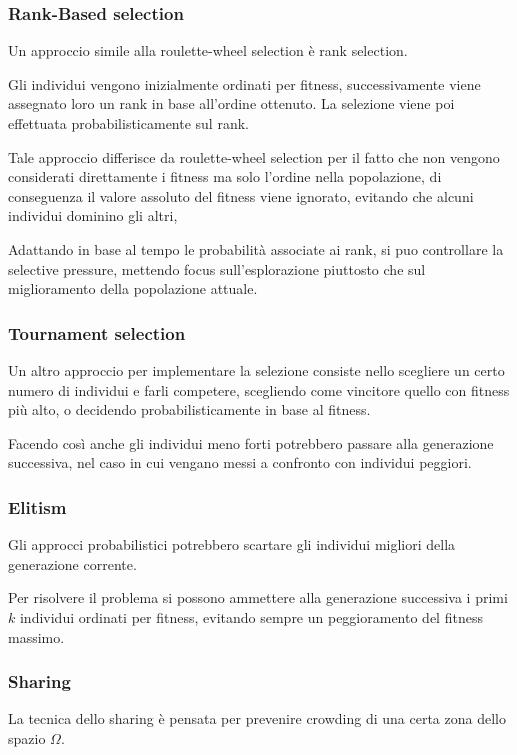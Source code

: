 \documentclass[a4paper]{article}
\begin{document}
\subsubsection{Rank-Based selection}
Un approccio simile alla roulette-wheel selection è rank selection.

Gli individui vengono inizialmente ordinati per fitness, successivamente viene 
assegnato loro un rank in base all'ordine ottenuto.
La selezione viene poi effettuata probabilisticamente sul rank.

Tale approccio differisce da roulette-wheel selection per il fatto che non vengono 
considerati direttamente i fitness ma solo l'ordine nella popolazione, 
di conseguenza il valore assoluto del fitness viene ignorato, evitando che 
alcuni individui dominino gli altri,

Adattando in base al tempo le probabilità associate ai rank, si puo controllare
la selective pressure, mettendo focus sull'esplorazione piuttosto che sul miglioramento
della popolazione attuale.

\subsubsection{Tournament selection}
Un altro approccio per implementare la selezione consiste nello scegliere
un certo numero di individui e farli competere, scegliendo come vincitore
quello con fitness più alto, o decidendo probabilisticamente in base al fitness.

Facendo così anche gli individui meno forti potrebbero passare alla generazione successiva, 
nel caso in cui vengano messi a confronto con individui peggiori.

\subsubsection{Elitism}
Gli approcci probabilistici potrebbero scartare gli individui migliori 
della generazione corrente.

Per risolvere il problema si possono ammettere alla generazione successiva i primi $k$
individui ordinati per fitness, evitando sempre un peggioramento del fitness massimo.

\subsubsection{Sharing}
La tecnica dello sharing è pensata per prevenire crowding di una certa zona 
dello spazio $\Omega$.
\end{document}
